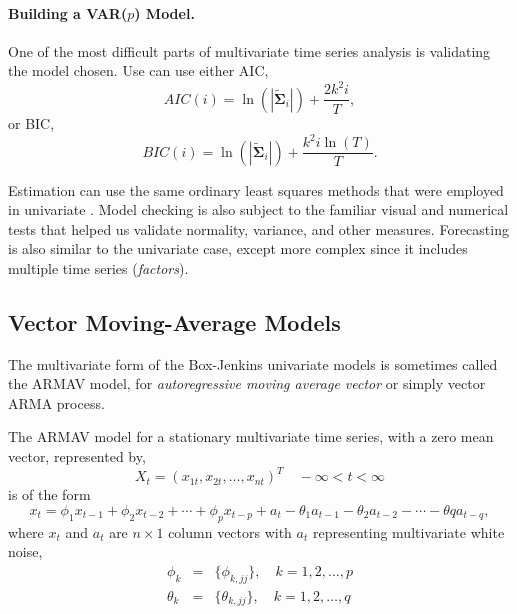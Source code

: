 \paragraph{Building a VAR($p$) Model.} One of the most difficult parts of multivariate time series analysis is validating the model chosen. Use can use either AIC,
\[
AIC(i)=\ln(|\tilde{\mathbf{\Sigma}}_i|) + \frac{2k^2i}{T},
\]
or BIC,
\[
BIC(i)=\ln(|\tilde{\mathbf{\Sigma}}_i|) + \frac{k^2i \ln(T)}{T}.
\]

Estimation can use the same ordinary least squares methods that were employed in univariate \fts{}. Model checking is also subject to the familiar visual and numerical tests that helped us validate normality, variance, and other measures. Forecasting is also similar to the univariate case, except more complex since it includes multiple time series (\emph{factors}).






\subsection{Vector Moving-Average Models}
The multivariate form of the Box-Jenkins univariate models is sometimes called the ARMAV model, for \emph{autoregressive moving average vector} or simply vector ARMA process.

The ARMAV model for a stationary multivariate time series, with a zero mean vector, represented by,
\[
X_t = (x_{1t}, x_{2t}, \ldots, x_{nt})^T  \quad -\infty < t < \infty
\]
is of the form
\[
x_t = \phi_1 x_{t-1} + \phi_2 x_{t-2} + \cdots + \phi_p x_{t-p} + a_{t} -  \theta_1 a_{t-1} - \theta_2 a_{t-2} - \cdots - \theta q a_{t-q},
\]
where $x_t$ and $a_t$ are $n \times 1$ column vectors with $a_t$ representing multivariate white noise,
\begin{eqnarray*}
\phi_k &=& \{\phi_{k,jj}\}, \quad k = 1,2, \ldots ,p \\
\theta_k &=& \{\theta_{k,jj}\}, \quad k = 1,2, \ldots ,q
\end{eqnarray*}


